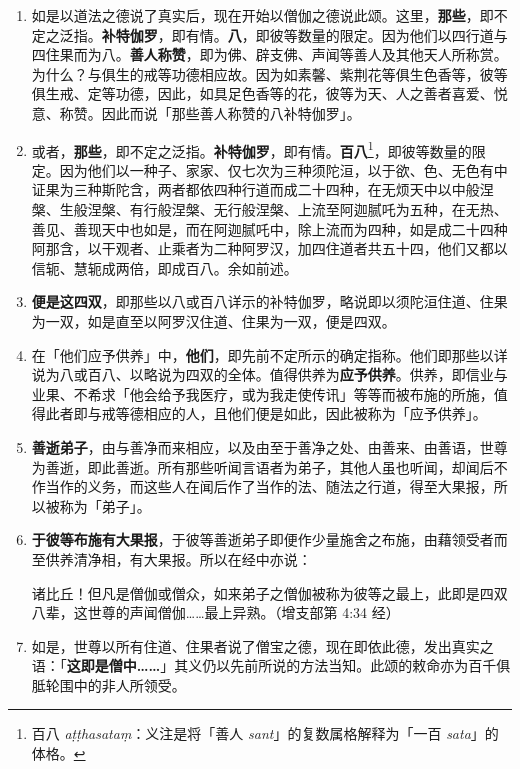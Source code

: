 \begin{enumerate}\item 如是以道法之德说了真实后，现在开始以僧伽之德说此颂。这里，\textbf{那些}，即不定之泛指。\textbf{补特伽罗}，即有情。\textbf{八}，即彼等数量的限定。因为他们以四行道与四住果而为八。\textbf{善人称赞}，即为佛、辟支佛、声闻等善人及其他天人所称赏。为什么？与俱生的戒等功德相应故。因为如素馨、紫荆花等俱生色香等，彼等俱生戒、定等功德，因此，如具足色香等的花，彼等为天、人之善者喜爱、悦意、称赞。因此而说「那些善人称赞的八补特伽罗」。
\item 或者，\textbf{那些}，即不定之泛指。\textbf{补特伽罗}，即有情。\textbf{百八}\footnote{百八 \textit{aṭṭhasataṃ}：义注是将「善人 \textit{sant}」的复数属格解释为「一百 \textit{sata}」的体格。}，即彼等数量的限定。因为他们以一种子、家家、仅七次为三种须陀洹，以于欲、色、无色有中证果为三种斯陀含，两者都依四种行道而成二十四种，在无烦天中以中般涅槃、生般涅槃、有行般涅槃、无行般涅槃、上流至阿迦腻吒为五种，在无热、善见、善现天中也如是，而在阿迦腻吒中，除上流而为四种，如是成二十四种阿那含，以干观者、止乘者为二种阿罗汉，加四住道者共五十四，他们又都以信轭、慧轭成两倍，即成百八。余如前述。
\item \textbf{便是这四双}，即那些以八或百八详示的补特伽罗，略说即以须陀洹住道、住果为一双，如是直至以阿罗汉住道、住果为一双，便是四双。
\item 在「他们应予供养」中，\textbf{他们}，即先前不定所示的确定指称。他们即那些以详说为八或百八、以略说为四双的全体。值得供养为\textbf{应予供养}。供养，即信业与业果、不希求「他会给予我医疗，或为我走使传讯」等等而被布施的所施，值得此者即与戒等德相应的人，且他们便是如此，因此被称为「应予供养」。
\item \textbf{善逝弟子}，由与善净而来相应，以及由至于善净之处、由善来、由善语，世尊为善逝，即此善逝。所有那些听闻言语者为弟子，其他人虽也听闻，却闻后不作当作的义务，而这些人在闻后作了当作的法、随法之行道，得至大果报，所以被称为「弟子」。
\item \textbf{于彼等布施有大果报}，于彼等善逝弟子即便作少量施舍之布施，由藉领受者而至供养清净相，有大果报。所以在经中亦说：\begin{quoting}诸比丘！但凡是僧伽或僧众，如来弟子之僧伽被称为彼等之最上，此即是四双八辈，这世尊的声闻僧伽……最上异熟。（增支部第 4:34 经）\end{quoting}
\item 如是，世尊以所有住道、住果者说了僧宝之德，现在即依此德，发出真实之语：「\textbf{这即是僧中……}」其义仍以先前所说的方法当知。此颂的敕命亦为百千俱胝轮围中的非人所领受。\end{enumerate}

